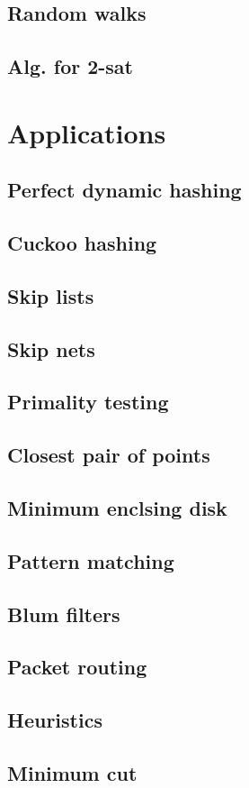 \documentclass{book}
\begin{document}
\section{Random walks}
\section{Alg. for 2-sat}

\chapter{Applications}
\section{Perfect dynamic hashing}
\section{Cuckoo hashing}
\section{Skip lists}
\section{Skip nets}
\section{Primality testing}
\section{Closest pair of points}
\section{Minimum enclsing disk}
\section{Pattern matching}
\section{Blum filters}
\section{Packet routing} 
\section{Heuristics}
\section{Minimum cut}


\nocite{*}

\newpage


\end{document}
